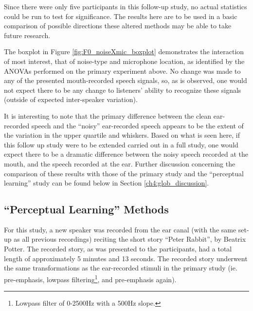 \documentclass[dissertation,copyright]{uathesis}
\begin{document}
Since there were only five participants in this follow-up study, no actual statistics could be run to test for significance.  The results here are to be used in a basic comparison of possible directions these altered methods may be able to take future research.

The boxplot in Figure \ref{fig:F0_noiseXmic_boxplot} demonstrates the interaction of most interest, that of noise-type and microphone location, as identified by the ANOVAs performed on the primary experiment above.  No change was made to any of the presented mouth-recorded speech signals, so, as is observed, one would not expect there to be any change to listeners' ability to recognize these signals (outside of expected inter-speaker variation).

It is interesting to note that the primary difference between the clean ear-recorded speech and the ``noisy'' ear-recorded speech appears to be the extent of the variation in the upper quartile and whiskers.  Based on what is seen here, if this follow up study were to be extended carried out in a full study, one would expect there to be a dramatic difference between the noisy speech recorded at the mouth, and the speech recorded at the ear.
Further discussion concerning the comparison of these results with those of the primary study and the ``perceptual learning'' study can be found below in Section \ref{ch4:glob_discussion}.


\subsection{``Perceptual Learning'' Methods}

For this study, a new speaker was recorded from the ear canal (with the same set-up as all previous recordings) reciting the short story ``Peter Rabbit'', by Beatrix Potter.  The recorded story, as was presented to the participants, had a total length of approximately 5 minutes and 13 seconds.  The recorded story underwent the same transformations as the ear-recorded stimuli in the primary study (ie. pre-emphasis, lowpass filtering\footnote{Lowpass filter of 0-2500Hz with a 500Hz slope.}, and pre-emphasis again).
\end{document}

